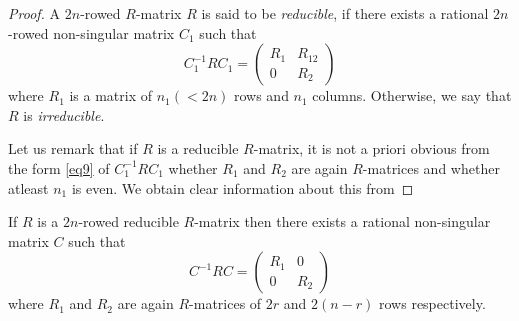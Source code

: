 \begin{proof}
A $2n$-rowed $R$-matrix $R$ is said to be {\em reducible}, if there
exists a rational $2n$-rowed non-singular matrix $C_1$ such that
\begin{equation*}
C^{-1}_1 R C_1 = \left(\begin{smallmatrix} R_1 & R_{12} \\ 0 &
 R_2 \end{smallmatrix} \right) \tag{9}\label{eq9}
\end{equation*}
where $R_1$ is a matrix of $n_1(<2n)$ rows and $n_1$
columns. Otherwise, we say that $R$ is {\em irreducible}.

Let us remark that if $R$ is a reducible $R$-matrix, it is not a
priori obvious from the form \eqref{eq9} of $C^{-1}_1 R C_1$ whether $R_1$ and
$R_2$ are again $R$-matrices and whether atleast $n_1$ is even. We
obtain clear information about this from
\end{proof}

\begin{thm}\label{chap1:thm1} 
If $R$ is a $2n$-rowed reducible
  $R$-matrix then there exists a rational non-singular matrix $C$ such
  that
\begin{equation*}
C^{-1} R C = \left(\begin{smallmatrix} R_1 & 0 \\ 0 &
 R_2 \end{smallmatrix} \right) \tag{10}\label{eq10}
\end{equation*}
where $R_1$ and $R_2$ are again $R$-matrices of $2r$ and $2(n-r)$ rows
respectively. 
\end{thm}

